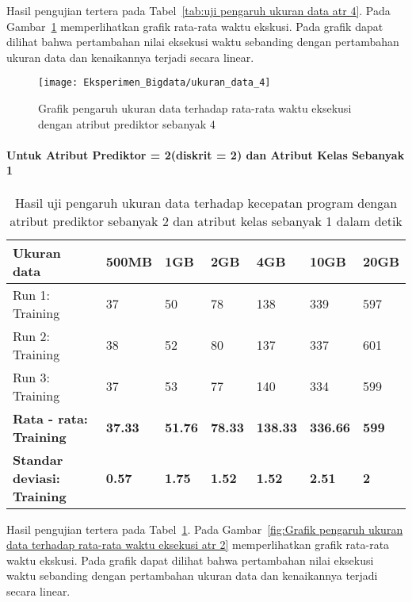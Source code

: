 Hasil pengujian tertera pada Tabel~\ref{tab:uji pengaruh ukuran data atr 4}. Pada Gambar~\ref{fig:Grafik pengaruh ukuran data terhadap rata-rata waktu eksekusi atr 4} memperlihatkan grafik rata-rata waktu ekskusi. Pada grafik dapat dilihat bahwa pertambahan nilai eksekusi waktu sebanding dengan pertambahan ukuran data dan kenaikannya terjadi secara linear.

\begin{figure}[H]
	\centering
	\texttt{[image: Eksperimen\_Bigdata/ukuran\_data\_4]}
	\caption[Grafik pengaruh ukuran data terhadap rata-rata waktu eksekusi dengan atribut prediktor sebanyak 4]{Grafik pengaruh ukuran data terhadap rata-rata waktu eksekusi dengan atribut prediktor sebanyak 4}
	\label{fig:Grafik pengaruh ukuran data terhadap rata-rata waktu eksekusi atr 4}
\end{figure}

\paragraph{Untuk Atribut Prediktor = 2(diskrit = 2) dan Atribut Kelas Sebanyak 1}

\begin{table}[H]
\label{tab:uji pengaruh ukuran data atr 2}
\centering
\caption{Hasil uji pengaruh ukuran data terhadap kecepatan program dengan atribut prediktor sebanyak 2 dan atribut kelas sebanyak 1 dalam detik}
\begin{tabular}{ | l | l | l | l | l | l | l | }
\hline
Ukuran data & 500MB & 1GB & 2GB & 4GB & 10GB & 20GB \\ \hline \hline
Run 1: Training & 37 & 50 & 78 & 138 & 339 & 597  \\ \hline
Run 2: Training & 38 & 52 & 80 & 137 & 337 & 601  \\ \hline
Run 3: Training & 37 & 53 & 77 & 140 & 334 & 599  \\ \hline
\textbf{Rata - rata: Training} & \textbf{37.33} & \textbf{51.76} & \textbf{78.33} & \textbf{138.33} & \textbf{336.66} & \textbf{599} \\ \hline
\textbf{Standar deviasi: Training} & \textbf{0.57} & \textbf{1.75} & \textbf{1.52} & \textbf{1.52} & \textbf{2.51} & \textbf{2} \\ \hline
\end{tabular}
\end{table}

Hasil pengujian tertera pada Tabel~\ref{tab:uji pengaruh ukuran data atr 2}. Pada Gambar~\ref{fig:Grafik pengaruh ukuran data terhadap rata-rata waktu eksekusi atr 2} memperlihatkan grafik rata-rata waktu ekskusi. Pada grafik dapat dilihat bahwa pertambahan nilai eksekusi waktu sebanding dengan pertambahan ukuran data dan kenaikannya terjadi secara linear.

